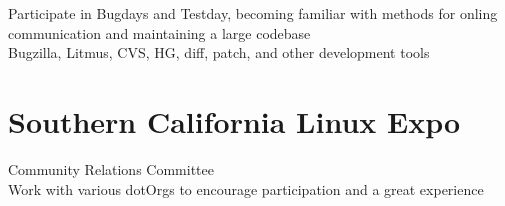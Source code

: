 \documentclass{res}
\begin{document}
\begin{resume}
	 Participate in Bugdays and Testday, becoming familiar with methods for onling communication and maintaining a large codebase\\
	 Bugzilla, Litmus, CVS, HG, diff, patch, and other development tools\\
\hspace{0.5in}\section{Southern California Linux Expo}
	 Community Relations Committee\\
	 Work with various dotOrgs to encourage participation and a great experience\\
 
\end{resume}
\end{document}

